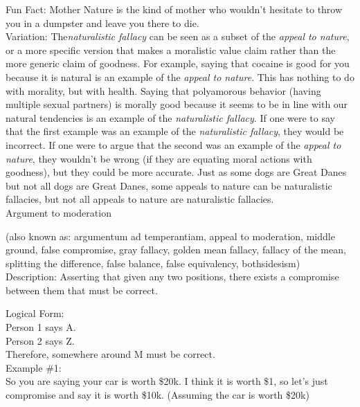 \documentclass[a4paper,12pt,single,pdftex]{scrartcl}
\begin{document}
      
        Fun Fact: Mother Nature is the kind of mother who wouldn’t hesitate to throw you in a dumpster and leave you there to die.
      \\

      
        Variation: The{\it  naturalistic fallacy} can be seen as a subset of the {\it appeal to nature}, or a more specific version that makes a moralistic value claim rather than the more generic claim of goodness. For example, saying that cocaine is good for you because it is natural is an example of the {\it appeal to nature}. This has nothing to do with morality, but with health. Saying that polyamorous behavior (having multiple sexual partners) is morally good because it seems to be in line with our natural tendencies is an example of the {\it naturalistic fallacy}. If one were to say that the first example was an example of the {\it naturalistic fallacy}, they would be incorrect. If one were to argue that the second was an example of the {\it appeal to nature}, they wouldn't be wrong (if they are equating moral actions with goodness), but they could be more accurate. Just as some dogs are Great Danes but not all dogs are Great Danes, some appeals to nature can be naturalistic fallacies, but not all appeals to nature are naturalistic fallacies.
      \\

    
  

Argument to moderation
    
      (also known as: argumentum ad temperantiam, appeal to moderation, middle ground, false compromise, gray fallacy, golden mean fallacy, fallacy of the mean, splitting the difference, false balance, false equivalency, bothsidesism)
    \\

  
    Description: Asserting that given any two positions, there exists a compromise between them that must be correct.

    
      Logical Form:
    \\

    
      Person 1 says A.
    \\

    
      Person 2 says Z.
    \\

    
      Therefore, somewhere around M must be correct.
    \\

    
      Example \#1:
    \\

    
      So you are saying your car is worth \$20k.  I think it is worth \$1, so let’s just compromise and say it is worth \$10k. (Assuming the car is worth \$20k)
    \\
\end{document}
